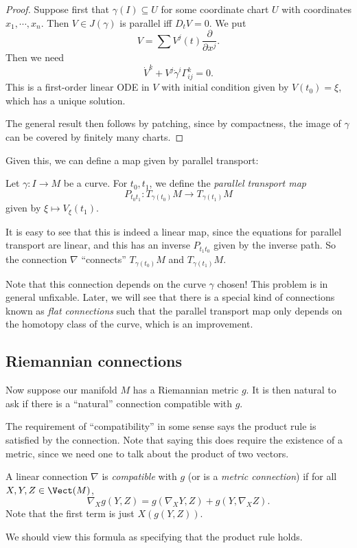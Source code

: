 \documentclass[a4paper]{article}
\begin{document}
\begin{proof}
  Suppose first that $\gamma(I) \subseteq U$ for some coordinate chart $U$ with coordinates $x_1, \cdots, x_n$. Then $V\in J(\gamma)$ is parallel iff $D_t V = 0$. We put
  \[
    V = \sum V^j(t) \frac{\partial}{\partial x^j}.
  \]
  Then we need
  \[
    \dot{V}^k + V^j \dot\gamma^i \Gamma_{ij}^k = 0.
  \]
  This is a first-order linear ODE in $V$ with initial condition given by $V(t_0) = \xi$, which has a unique solution.

  The general result then follows by patching, since by compactness, the image of $\gamma$ can be covered by finitely many charts.
\end{proof}

Given this, we can define a map given by parallel transport:
\begin{defi}
  Let $\gamma: I \to M$ be a curve. For $t_0, t_1$, we define the \emph{parallel transport map}
  \[
    P_{t_0 t_1}: T_{\gamma(t_0)}M \to T_{\gamma(t_1)}M
  \]
  given by $\xi \mapsto V_{\xi}(t_1)$.
\end{defi}

It is easy to see that this is indeed a linear map, since the equations for parallel transport are linear, and this has an inverse $P_{t_1t_0}$ given by the inverse path. So the connection $\nabla$ ``connects'' $T_{\gamma(t_0)}M$ and $T_{\gamma(t_1)}M$.

Note that this connection depends on the curve $\gamma$ chosen! This problem is in general unfixable. Later, we will see that there is a special kind of connections known as \emph{flat connections} such that the parallel transport map only depends on the homotopy class of the curve, which is an improvement.

\subsection{Riemannian connections}
Now suppose our manifold $M$ has a Riemannian metric $g$. It is then natural to ask if there is a ``natural'' connection compatible with $g$.

The requirement of ``compatibility'' in some sense says the product rule is satisfied by the connection. Note that saying this does require the existence of a metric, since we need one to talk about the product of two vectors.

\begin{defi}
  A linear connection $\nabla$ is \emph{compatible} with $g$ (or is a \emph{metric connection}) if for all $X, Y, Z \in \Vect(M)$,
  \[
    \nabla_X g(Y, Z) = g(\nabla_X Y, Z) + g(Y, \nabla_X Z).
  \]
  Note that the first term is just $X(g(Y, Z))$.
\end{defi}
We should view this formula as specifying that the product rule holds.
\end{document}
